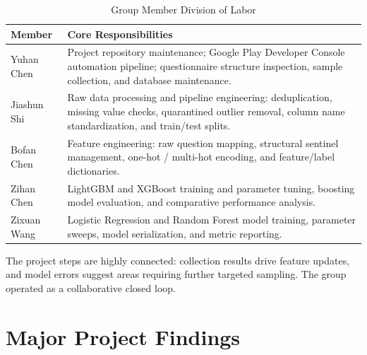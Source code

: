\documentclass[11pt,a4paper]{article}
\begin{document}
\begin{table}[H]
\centering
\caption{Group Member Division of Labor}
\label{tab:division}
\renewcommand{\arraystretch}{1.35}
\begin{tabularx}{\textwidth}{p{2.5cm}X}
\toprule
Member & Core Responsibilities \\
\midrule
Yuhan Chen & Project repository maintenance; Google Play Developer Console automation pipeline; questionnaire structure inspection, sample collection, and database maintenance. \\
Jiashun Shi & Raw data processing and pipeline engineering: deduplication, missing value checks, quarantined outlier removal, column name standardization, and train/test splits. \\
Bofan Chen & Feature engineering: raw question mapping, structural sentinel management, one-hot / multi-hot encoding, and feature/label dictionaries. \\
Zihan Chen & LightGBM and XGBoost training and parameter tuning, boosting model evaluation, and comparative performance analysis. \\
Zixuan Wang & Logistic Regression and Random Forest model training, parameter sweeps, model serialization, and metric reporting. \\
\bottomrule
\end{tabularx}
\end{table}

The project steps are highly connected: collection results drive feature updates, and model errors suggest areas requiring further targeted sampling. The group operated as a collaborative closed loop.

\section{Major Project Findings}
\end{document}
